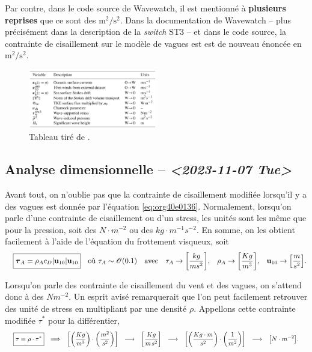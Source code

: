 \documentclass[10pt]{report}
\numberwithin{equation}{section}
\newcommand{\uu}{\vb{u}}
\newcommand{\tall}{\vphantom{A^{x^x}_p}}
\newcommand{\pt}{\hspace{1pt}} %
\begin{document}
Par contre, dans le code source de Wavewatch, il est mentionné à \textbf{plusieurs reprises} que ce sont des \(\mathrm{m}^2/\mathrm{s}^2\).
Dans la documentation de Wavewatch -- plus précisément dans la description de la \emph{switch} ST3 -- et dans le code source, la contrainte de cisaillement sur le modèle de vagues est est de nouveau énoncée en \(\mathrm{m}^2/\mathrm{s}^2\).

\begin{figure}[ht]
\centering
\includegraphics[width=0.5\textwidth]{figures/articles/gmd-13-3067-2020-t01-web.png}
\caption{\label{fig:org82d114e}Tableau tiré de \textcite{couvelard2020development}.}
\end{figure}


\subsection{Analyse dimensionnelle -- \textit{<2023-11-07 Tue>}}
\label{sec:org90c56f3}
\label{org0f74afc}

Avant tout, on n'oublie pas que la contrainte de cisaillement modifiée lorsqu'il y a des vagues est donnée par l'équation \ref{eq:org40e0136}. 
Normalement, lorsqu'on parle d'une contrainte de cisaillement ou d'un stress, les unités sont les même que pour la pression, soit des \(N\cdot m^{-2}\) ou des \(kg\cdot m^{-1}s^{-2}\).
En somme, on les obtient facilement à l'aide de l'équation du frottement visqueux, soit
\begin{align}
   && \boxed{\boldsymbol{\tau}_{A} = \rho_A c_D \abs{\uu_{10}} \uu_{10}\tall }
   && \text{où}\  \tau_A \sim \mathscr{O}\qty(0.1)
   && \text{avec}
   && \tau_A \rightarrow \qty[\frac{kg}{ms^2}],
   && \rho_A \rightarrow \qty[\frac{Kg}{m^3}],
   && \uu_{10} \rightarrow \qty[\frac{m}{s^2}].
\end{align}

Lorsqu'on parle des contrainte de cisaillement du vent et des vagues, on s'attend donc à des \(N m^{-2}\).
Un esprit avisé remarquerait que l'on peut facilement retrouver des unité de stress en multipliant par une densité \(\rho\).
Appellons cette contrainte modifiée \(\tau^*\) pour la différentier,
\begin{align}
   && \boxed{\tau = \rho \cdot \tau^*\tall}
   &&\Longrightarrow
   &&\qty[\qty(\frac{Kg}{m^3})\cdot \qty(\frac{m^2}{s^2})]
   &&\longrightarrow
   &&\qty[ \frac{Kg}{m\pt s^2} ]
   &&\longrightarrow
   &&\qty[\qty(\frac{Kg\cdot m}{s^2})\cdot \qty(\frac{1}{m^2})]
   &&\longrightarrow
   &&\qty[N \cdot m^{-2}]. &&
\end{align}
\end{document}
